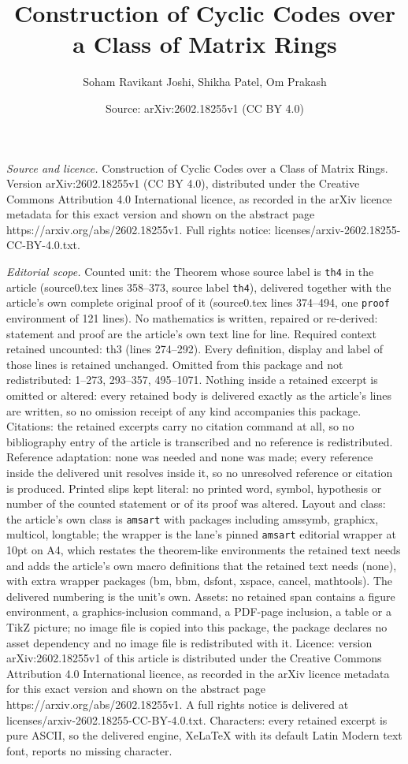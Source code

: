 \documentclass[10pt,a4paper]{amsart}
\title[Construction of Cyclic Codes over a Class of Matrix Rings]{Construction of Cyclic Codes over a Class of Matrix Rings}
\author{Soham Ravikant Joshi, Shikha Patel, Om Prakash}
\date{Source: arXiv:2602.18255v1 (CC BY 4.0)}
\begin{document}
\maketitle

\noindent\emph{Source and licence.} Construction of Cyclic Codes over a Class of Matrix Rings. Version arXiv:2602.18255v1 (CC BY 4.0), distributed under the Creative Commons Attribution 4.0 International licence, as recorded in the arXiv licence metadata for this exact version and shown on the abstract page https://arxiv.org/abs/2602.18255v1. Full rights notice: licenses/arxiv-2602.18255-CC-BY-4.0.txt.\par\smallskip

\noindent\textit{Editorial scope.} Counted unit: the Theorem whose source label is \texttt{th4} in the article (source0.tex lines 358--373, source label \texttt{th4}), delivered together with the article's own complete original proof of it (source0.tex lines 374--494, one \texttt{proof} environment of 121 lines). No mathematics is written, repaired or re-derived: statement and proof are the article's own text line for line. Required context retained uncounted: th3 (lines 274--292). Every definition, display and label of those lines is retained unchanged. Omitted from this package and not redistributed: 1--273, 293--357, 495--1071. Nothing inside a retained excerpt is omitted or altered: every retained body is delivered exactly as the article's lines are written, so no omission receipt of any kind accompanies this package. Citations: the retained excerpts carry no citation command at all, so no bibliography entry of the article is transcribed and no reference is redistributed. Reference adaptation: none was needed and none was made; every reference inside the delivered unit resolves inside it, so no unresolved reference or citation is produced. Printed slips kept literal: no printed word, symbol, hypothesis or number of the counted statement or of its proof was altered. Layout and class: the article's own class is \texttt{amsart} with packages including amssymb, graphicx, multicol, longtable; the wrapper is the lane's pinned \texttt{amsart} editorial wrapper at 10pt on A4, which restates the theorem-like environments the retained text needs and adds the article's own macro definitions that the retained text needs (none), with extra wrapper packages (bm, bbm, dsfont, xspace, cancel, mathtools). The delivered numbering is the unit's own. Assets: no retained span contains a figure environment, a graphics-inclusion command, a PDF-page inclusion, a table or a TikZ picture; no image file is copied into this package, the package declares no asset dependency and no image file is redistributed with it. Licence: version arXiv:2602.18255v1 of this article is distributed under the Creative Commons Attribution 4.0 International licence, as recorded in the arXiv licence metadata for this exact version and shown on the abstract page https://arxiv.org/abs/2602.18255v1. A full rights notice is delivered at licenses/arxiv-2602.18255-CC-BY-4.0.txt. Characters: every retained excerpt is pure ASCII, so the delivered engine, XeLaTeX with its default Latin Modern text font, reports no missing character.
\end{document}
